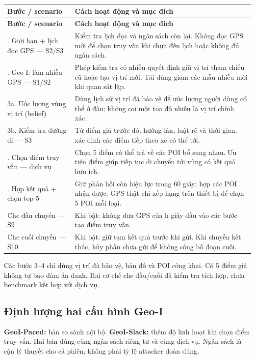 \begingroup\small
\begin{longtable}{@{}P{5.006cm}P{11.913cm}@{}}
\toprule
\textbf{Bước / scenario} & \textbf{Cách hoạt động và mục đích}\\\midrule
\endfirsthead
\toprule
\textbf{Bước / scenario} & \textbf{Cách hoạt động và mục đích}\\\midrule
\endhead
\bottomrule{}. Giới hạn + lịch đọc GPS — S2/S3 & Kiểm tra lịch đọc và ngân sách còn lại. Không đọc GPS mới để chọn truy vấn khi chưa đến lịch hoặc không đủ ngân sách.\\
. Geo-I: làm nhiễu GPS — S1/S2 & Phép kiểm tra có nhiễu quyết định giữ vị trí tham chiếu cũ hoặc tạo vị trí mới. Tái dùng giảm các mẫu nhiễu mới khi quan sát lặp.\\
\addlinespace[3pt]
3a. Ước lượng vùng vị trí (belief) & Dùng lịch sử vị trí đã bảo vệ để ước lượng người dùng có thể ở đâu; không coi một tọa độ nhiễu là vị trí chính xác.\\
\addlinespace[3pt]
3b. Kiểm tra đường đi — S3 & Từ điểm giả trước đó, hướng làn, luật rẽ và thời gian, xác định các điểm tiếp theo xe có thể tới.\\
. Chọn điểm truy vấn — dịch vụ & Chọn 5 điểm có thể trả về các POI bổ sung nhau. Ưu tiên điểm giúp tiếp tục di chuyển tới vùng có kết quả hữu ích.\\
. Hợp kết quả + chọn top-5 & Giữ phản hồi còn hiệu lực trong 60 giây; hợp các POI nhận được. GPS thật chỉ xếp hạng trên thiết bị để chọn 5 POI mỗi loại.\\
\addlinespace[3pt]
Che đầu chuyến — S9 & Khi bật: không đưa GPS của h giây đầu vào các bước tạo điểm truy vấn.\\
\addlinespace[3pt]
Che cuối chuyến — S10 & Khi bật: giữ tạm kết quả trước khi gửi. Khi chuyến kết thúc, hủy phần chưa gửi để không công bố đoạn cuối.\\
\end{longtable}
\endgroup
Các bước 3–4 chỉ dùng vị trí đã bảo vệ, bản đồ và POI công khai. Có 5 điểm giả không tự bảo đảm ẩn danh. Hai cơ chế che đầu/cuối đã kiểm tra tích hợp, chưa benchmark kết hợp với dịch vụ.

\subsection{Định lượng hai cấu hình Geo-I}
\textbf{GeoI-Paced:} bản so sánh nội bộ. \textbf{GeoI-Slack:} thêm độ linh hoạt khi chọn điểm truy vấn. Hai bản dùng cùng ngân sách riêng tư và cùng dịch vụ. Ngân sách là cận lý thuyết cho cả phiên, không phải tỷ lệ attacker đoán đúng.

